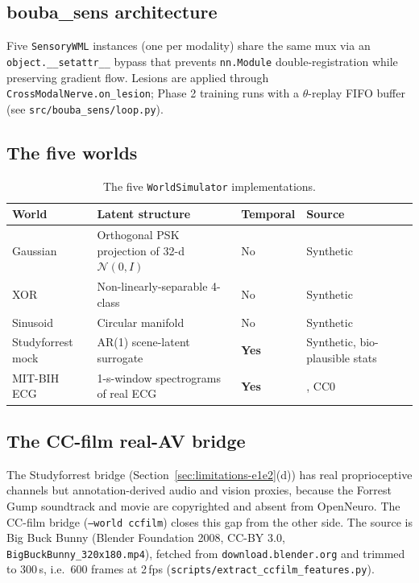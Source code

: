 \documentclass{article}
\begin{document}
\subsection{bouba\_sens architecture}

Five \texttt{SensoryWML} instances (one per modality) share the
same mux via an \texttt{object.\_\_setattr\_\_} bypass that
prevents \texttt{nn.Module} double-registration while preserving
gradient flow. Lesions are applied through
\texttt{CrossModalNerve.on\_lesion}; Phase 2 training runs with a
$\theta$-replay FIFO buffer (see \texttt{src/bouba\_sens/loop.py}).

\subsection{The five worlds}
\label{sec:worlds}

\begin{table}[t]
  \centering
  \caption{The five \texttt{WorldSimulator} implementations.}
  \label{tab:worlds}
  \begin{tabular}{lllll}
    \toprule
    World & Latent structure & Temporal & Source \\
    \midrule
    Gaussian & Orthogonal PSK projection of 32-d $\mathcal{N}(0, I)$ & No & Synthetic \\
    XOR & Non-linearly-separable 4-class & No & Synthetic \\
    Sinusoid & Circular manifold & No & Synthetic \\
    Studyforrest mock & AR(1) scene-latent surrogate & \textbf{Yes} & Synthetic, bio-plausible stats \\
    MIT-BIH ECG & 1-s-window spectrograms of real ECG & \textbf{Yes} & \citet{moody2001mitbih}, CC0 \\
    \bottomrule
  \end{tabular}
\end{table}

\subsection{The CC-film real-AV bridge}
\label{sec:ccfilm}

The Studyforrest bridge (Section~\ref{sec:limitations-e1e2}(d)) has
real proprioceptive channels but annotation-derived audio and vision
proxies, because the Forrest Gump soundtrack and movie are
copyrighted and absent from OpenNeuro. The CC-film bridge
(\texttt{--world ccfilm}) closes this gap from the other side. The
source is Big Buck Bunny (Blender Foundation 2008, CC-BY 3.0,
\texttt{BigBuckBunny\_320x180.mp4}), fetched from
\texttt{download.blender.org} and trimmed to 300\,s, i.e.\ 600 frames
at 2\,fps (\texttt{scripts/extract\_ccfilm\_features.py}).
\end{document}

